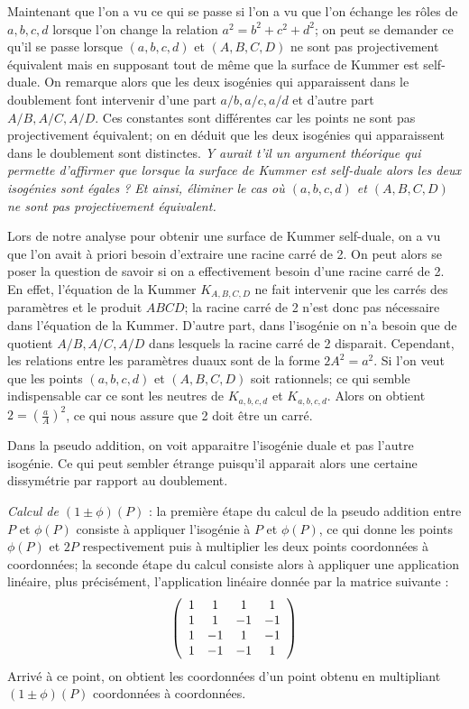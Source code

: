 \documentclass[a4paper]{article}
\theoremstyle{definition}
\theoremstyle{remark}
\numberwithin{equation}{section}
\begin{document}
Maintenant que l'on a vu ce qui se passe si l'on a vu que l'on échange les rôles de $a,b,c,d$ lorsque l'on change la relation $a^2 = b^2 + c^2 + d^2$; on peut se demander ce qu'il se passe lorsque $(a,b,c,d)$ et $(A,B,C,D)$ ne sont pas projectivement équivalent mais en supposant tout de même que la surface de Kummer est self-duale. On remarque alors que les deux isogénies qui apparaissent dans le doublement font intervenir d'une part $a/b,a/c,a/d$ et d'autre part $A/B,A/C,A/D$. Ces constantes sont différentes car les points ne sont pas projectivement équivalent; on en déduit que les deux isogénies qui apparaissent dans le doublement sont distinctes. \emph{Y aurait t'il un argument théorique qui permette d'affirmer que lorsque la surface de Kummer est self-duale alors les deux isogénies sont égales ? Et ainsi, éliminer le cas où $(a,b,c,d)$ et $(A,B,C,D)$ ne sont pas projectivement équivalent.}

Lors de notre analyse pour obtenir une surface de Kummer self-duale, on a vu que l'on avait à priori besoin d'extraire une racine carré de 2. On peut alors se poser la question de savoir si on a effectivement besoin d'une racine carré de 2. En effet, l'équation de la Kummer $K_{A,B,C,D}$ ne fait intervenir que les carrés des paramètres et le produit $ABCD$; la racine carré de 2 n'est donc pas nécessaire dans l'équation de la Kummer. D'autre part, dans l'isogénie on n'a besoin que de quotient $A/B,A/C,A/D$ dans lesquels la racine carré de 2 disparait. Cependant, les relations entre les paramètres duaux sont de la forme $2A^2 = a^2$. Si l'on veut que les points $(a,b,c,d)$ et $(A,B,C,D)$ soit rationnels; ce qui semble indispensable car ce sont les neutres de $K_{a,b,c,d}$ et $K_{a,b,c,d}$. Alors on obtient $2 = (\frac{a}{A})^2$, ce qui nous assure que 2 doit être un carré.

Dans la pseudo addition, on voit apparaitre l'isogénie duale et pas l'autre isogénie. Ce qui peut sembler étrange puisqu'il apparait alors une certaine dissymétrie par rapport au doublement.

\emph{Calcul de $(1 \pm \phi)(P)$} : la première étape du calcul de la pseudo addition entre $P$ et $\phi(P)$ consiste à appliquer l'isogénie à $P$ et $\phi(P)$, ce qui donne les points $\phi(P)$ et $2P$ respectivement puis à multiplier les deux points coordonnées à coordonnées; la seconde étape du calcul consiste alors à appliquer une application linéaire, plus précisément, l'application linéaire donnée par la matrice suivante :
\[ \left(
  \begin{array}{ c c c c}
     1 & 1 & 1 & 1\\
     1 & 1 & -1 & -1\\
     1 & -1 & 1 & -1\\
     1 & -1 & -1 & 1\\
  \end{array} \right)
\]
Arrivé à ce point, on obtient les coordonnées d'un point obtenu en multipliant $(1 \pm \phi)(P)$ coordonnées à coordonnées.
\end{document}
